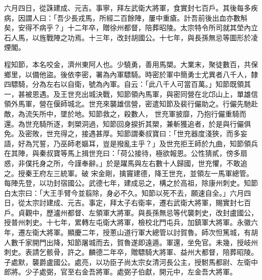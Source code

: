 \begin{pinyinscope}
 六月四日，從誅建成、元吉。事寧，拜左武衛大將軍，食實封七百戶。其後每多疾病，因謂人曰：「吾少長戎馬，所經二百餘陣，屢中重瘡。計吾前後出血亦數斛矣，安得不病乎？」十二年卒，贈徐州都督，陪葬昭陵。太宗特令所司就其塋內立石人馬，以旌戰陣之功焉。十三年，改封胡國公。十七年，與長孫無忌等圖形於凌煙閣。



 程知節，本名咬金，濟州東阿人也。少驍勇，善用馬槊。大業末，聚徒數百，共保鄉里，以備他盜。後依李密，署為內軍驃騎。時密於軍中簡勇士尤異者八千人，隸四驃騎，分為左右以自衛，號為內軍。自云：「此八千人可當百萬。」知節既領其一，甚被恩遇。及王世充出城決戰，知節領內馬軍，與密同營在北邙山上，單雄信領外馬軍，營在偃師城北。世充來襲雄信營，密遣知節及裴行儼助之。行儼先馳赴敵，為流矢所中，墜於地。知節救之，殺數人，
 世充軍披靡，乃抱行儼重騎而還。為世充騎所逐，刺槊洞過，知節回身捩折其槊，兼斬獲追者，於是與行儼俱免。及密敗，世充得之，接遇甚厚。知節謂秦叔寶曰：「世充器度淺狹，而多妄語，好為咒誓，乃巫師老嫗耳，豈是撥亂主乎？」及世充拒王師於九曲，知節領兵在其陣，與秦叔寶等馬上揖世充曰：「荷公接待，極欲報恩。公性猜貳，傍多扇惑，非僕托身之所，今謹奉辭。」於是躍馬與左右數十人歸國，世充懼，不敢追之。授秦王府左三統軍。破
 宋金剛，擒竇建德，降王世充，並領左一馬軍總管。每陣先登，以功封宿國公。武德七年，建成忌之，構之於高祖，除康州刺史。知節白太宗曰：「大王手臂今並翦除，身必不久。知節以死不去，願速自全。」六月四日，從太宗討建成、元吉。事定，拜太子右衛率，遷右武衛大將軍，賜實封七百戶。貞觀中，歷瀘州都督、左領軍大將軍。與長孫無忌等代襲刺史，改封盧國公，授普州刺史。十七年，累轉左屯衛大將軍，檢校北門屯兵，加鎮軍大將軍。永徽六
 年，遷左衛大將軍。顯慶二年，授蔥山道行軍大總管以討賀魯。師次怛篤城，有胡人數千家開門出降，知節屠城而去，賀魯遂即遠遁。軍還，坐免官。未幾，授岐州刺史。表請乞骸骨，許之。麟德二年卒，贈驃騎大將軍、益州大都督，陪葬昭陵。子處默，襲爵盧國公。處亮，以功臣子尚太宗女清河長公主，授駙馬都尉、左衛中郎將。少子處弼，官至右金吾將軍。處弼子伯獻，開元中，左金吾大將軍。




\end{pinyinscope}
